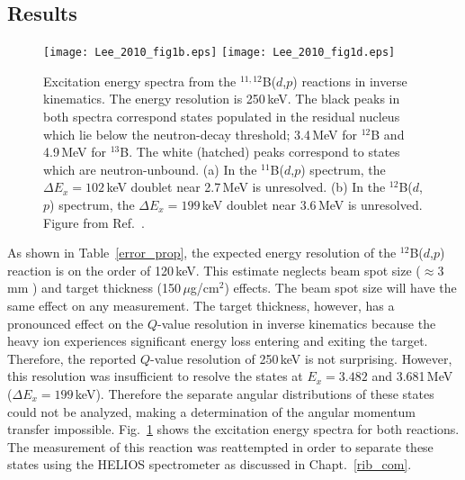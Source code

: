 \subsection{Results}
\begin{figure}%
\centering
{}%
\texttt{[image: Lee\_2010\_fig1b.eps]}
\texttt{[image: Lee\_2010\_fig1d.eps]}
\caption[Excitation energy spectra from the $^{11,12}$B($d$,$p$) reactions in inverse kinematics]{Excitation energy spectra from the $^{11,12}$B($d$,$p$) reactions in inverse kinematics.  The energy resolution is 250\,keV.  The black peaks in both spectra correspond states populated in the residual nucleus which lie below the neutron-decay threshold; 3.4\,MeV for $^{12}$B and 4.9\,MeV for $^{13}$B.  The white (hatched) peaks correspond to states which are neutron-unbound.  (a) In the $^{11}$B($d$,$p$) spectrum, the $\Delta E_x=102$\,keV doublet near 2.7\,MeV is unresolved.  (b) In the $^{12}$B($d$,$p$) spectrum, the $\Delta E_x=199$\,keV doublet near 3.6\,MeV is unresolved.  Figure from Ref.~\cite[Fig.~1]{Lee_2010}.}
\label{b11b12_spec}%
\end{figure}

As shown in Table~\ref{error_prop}, the expected energy resolution of the $^{12}$B($d$,$p$) reaction is on the order of 120\,keV.  This estimate neglects beam spot size ($\approx 3$\,mm ) and target thickness (150\,$\mu$g/cm$^2$) effects. The beam spot size will have the same effect on any measurement.  The target thickness, however, has a pronounced effect on the $Q$-value resolution in inverse kinematics because the heavy ion experiences significant energy loss entering and exiting the target. %
Therefore, the reported $Q$-value resolution of 250\,keV is not surprising.  However, this resolution was insufficient to resolve the states at $E_x=3.482$ and 3.681\,MeV ($\Delta E_x=199$\,keV).  Therefore the separate angular distributions of these states could not be analyzed, making a determination of the angular momentum transfer impossible.  Fig.~\ref{b11b12_spec} shows the excitation energy spectra for both reactions.  The measurement of this reaction was re\-at\-tempt\-ed in order to separate these states using the HELIOS spectrometer as discussed in Chapt.~\ref{rib_com}.

